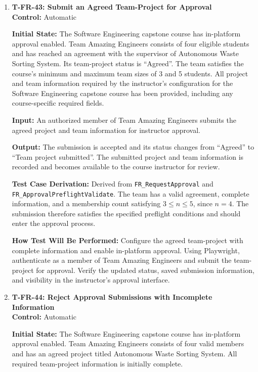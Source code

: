 \documentclass[12pt, titlepage]{article}
\begin{document}
\begin{enumerate}

\item \label{T-FR-43}\textbf{T-FR-43: Submit an Agreed Team-Project for Approval}\\

\textbf{Control:} Automatic

\textbf{Initial State:} The Software Engineering capstone course has in-platform approval enabled. Team Amazing Engineers consists of four eligible students and has reached an agreement with the supervisor of Autonomous Waste Sorting System. Its team-project status is ``Agreed''. The team satisfies the course's minimum and maximum team sizes of 3 and 5 students. All project and team information required by the instructor's configuration for the Software Engineering capstone course has been provided, including any course-specific required fields.

\textbf{Input:} An authorized member of Team Amazing Engineers submits the agreed project and team information for instructor approval.

\textbf{Output:} The submission is accepted and its status changes from ``Agreed'' to ``Team project submitted''. The submitted project and team information is recorded and becomes available to the course instructor for review.

\textbf{Test Case Derivation:} Derived from \texttt{FR\_RequestApproval} and \texttt{FR\_ApprovalPreflightValidate}. The team has a valid agreement, complete information, and a membership count satisfying $3 \leq n \leq 5$, since $n=4$. The submission therefore satisfies the specified preflight conditions and should enter the approval process.

\textbf{How Test Will Be Performed:} Configure the agreed team-project with complete information and enable in-platform approval. Using Playwright, authenticate as a member of Team Amazing Engineers and submit the team-project for approval. Verify the updated status, saved submission information, and visibility in the instructor's approval interface.

\item \label{T-FR-44}\textbf{T-FR-44: Reject Approval Submissions with Incomplete Information}\\

\textbf{Control:} Automatic

\textbf{Initial State:} The Software Engineering capstone course has in-platform approval enabled. Team Amazing Engineers consists of four valid members and has an agreed project titled Autonomous Waste Sorting System. All required team-project information is initially complete.


\end{enumerate}
\end{document}
